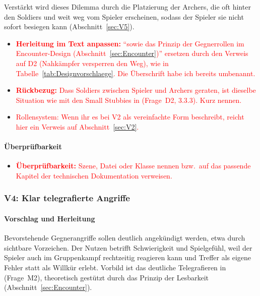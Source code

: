 \documentclass[../Main.tex]{subfiles}
\begin{document}
Verstärkt wird dieses Dilemma durch die Platzierung der Archers, die oft hinter den Soldiers und weit weg vom Spieler erscheinen, sodass der Spieler sie nicht sofort besiegen kann (Abschnitt~\ref{sec:V5}).

\begin{itemize}[leftmargin=1.5cm]
    \item \textcolor{red}{\textbf{Herleitung im Text anpassen:} \enquote{sowie das Prinzip der Gegnerrollen im Encounter-Design (Abschnitt~\ref{sec:Encounter})} ersetzen durch den Verweis auf  D2 (Nahkämpfer versperren den Weg), wie in Tabelle~\ref{tab:Designvorschlaege}. Die Überschrift habe ich bereits umbenannt.}
    \item \textcolor{red}{\textbf{Rückbezug:} Dass Soldiers zwischen Spieler und Archers geraten, ist dieselbe Situation wie mit den Small Stubbies in  (Frage~D2, 3.3.3). Kurz nennen.}
    \item \textcolor{red}{Rollensystem: Wenn ihr es bei V2 als vereinfachte Form beschreibt, reicht hier ein Verweis auf Abschnitt~\ref{sec:V2}.}
\end{itemize}

\paragraph{Überprüfbarkeit}
\begin{itemize}[leftmargin=1.5cm]
    \item \textcolor{red}{\textbf{Überprüfbarkeit:} Szene, Datei oder Klasse nennen bzw.\ auf das passende Kapitel der technischen Dokumentation verweisen.}
\end{itemize}

\subsubsection{V4: Klar telegrafierte Angriffe} \label{sec:V4}

\paragraph{Vorschlag und Herleitung}
Bevorstehende Gegnerangriffe sollen deutlich angekündigt werden, etwa durch sichtbare Vorzeichen. Der Nutzen betrifft Schwierigkeit und Spielgefühl, weil der Spieler auch im Gruppenkampf rechtzeitig reagieren kann und Treffer als eigene Fehler statt als Willkür erlebt. Vorbild ist das deutliche Telegrafieren in  (Frage~M2), theoretisch gestützt durch das Prinzip der Lesbarkeit (Abschnitt~\ref{sec:Encounter}).
\end{document}
